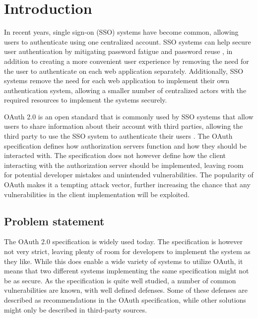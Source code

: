 \section{Introduction}
\label{sec:intro}

\thispagestyle{empty}

In recent years, single sign-on (SSO) systems have become common, allowing users to authenticate using one centralized account.
SSO systems can help secure user authentication by mitigating password fatigue and password reuse \citep{dhamija_seven_2008}, in addition to creating a more convenient user experience by removing the need for the user to authenticate on each web application separately.
Additionally, SSO systems remove the need for each web application to implement their own authentication system, allowing a smaller number of centralized actors with the required resources to implement the systems securely.

OAuth 2.0 is an open standard that is commonly used by SSO systems that allow users to share information about their account with third parties, allowing the third party to use the SSO system to authenticate their users \citep{fett_comprehensive_2016}.
The OAuth specification defines how authorization servers function and how they should be interacted with.
The specification does not however define how the client interacting with the authorization server should be implemented, leaving room for potential developer mistakes and unintended vulnerabilities.
The popularity of OAuth makes it a tempting attack vector, further increasing the chance that any vulnerabilities in the client implementation will be exploited.

\subsection{Problem statement}

The OAuth 2.0 specification is widely used today.
The specification is however not very strict, leaving plenty of room for developers to implement the system as they like.
While this does enable a wide variety of systems to utilize OAuth, it means that two different systems implementing the same specification might not be as secure.
As the specification is quite well studied, a number of common vulnerabilities are known, with well defined defenses.
Some of these defenses are described as recommendations in the OAuth specification, while other solutions might only be described in third-party sources.

